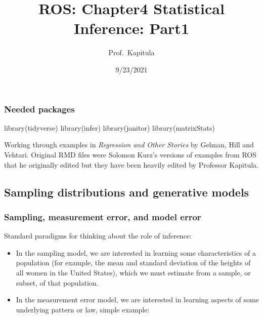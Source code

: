\documentclass[
]{article}
\title{ROS: Chapter4 Statistical Inference: Part1}
\author{Prof.~Kapitula}
\date{9/23/2021}
\newenvironment{Shaded}{\begin{snugshade}}{\end{snugshade}}
\newcommand{\FunctionTok}[1]{\textcolor[rgb]{0.00,0.00,0.00}{#1}}
\newcommand{\NormalTok}[1]{#1}
\begin{document}
\maketitle

\hypertarget{needed-packages}{%
\subsubsection*{Needed packages}\label{needed-packages}}

\begin{Shaded}
\begin{Highlighting}[]
\FunctionTok{library}\NormalTok{(tidyverse)}
\FunctionTok{library}\NormalTok{(infer)}
\FunctionTok{library}\NormalTok{(janitor)}
\FunctionTok{library}\NormalTok{(matrixStats)}
\end{Highlighting}
\end{Shaded}

Working through examples in \emph{Regression and Other Stories} by
Gelman, Hill and Vehtari. Original RMD files were Solomon Kurz's
versions of examples from ROS that he originally edited but they have
been heavily edited by Professor Kapitula.

\hypertarget{sampling-distributions-and-generative-models}{%
\subsection{Sampling distributions and generative
models}\label{sampling-distributions-and-generative-models}}

\hypertarget{sampling-measurement-error-and-model-error}{%
\subsubsection{Sampling, measurement error, and model
error}\label{sampling-measurement-error-and-model-error}}

Standard paradigms for thinking about the role of inference:

\begin{itemize}
\item
  In the sampling model, we are interested in learning some
  characteristics of a population (for example, the mean and standard
  deviation of the heights of all women in the United States), which we
  must estimate from a sample, or subset, of that population.
\item
  In the measurement error model, we are interested in learning aspects
  of some underlying pattern or law, simple example:
\end{itemize}
\end{document}

